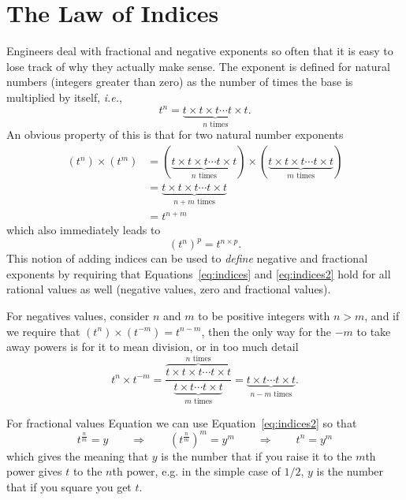 \section{The Law of Indices}

Engineers deal with fractional and negative exponents so often that it is easy to lose track of why they actually make sense. The exponent is defined for natural numbers (integers greater than zero) as the number of times the base is multiplied by itself, \textit{i.e.},
\begin{equation}
  t^n = \underbrace{t \times t \times t \cdots t \times t}_{\mbox{$n$ times}}.
  \label{eq:power}
\end{equation}
An obvious property of this is that for two natural number exponents
\begin{align}
  \left(t^n\right) \times \left( t^m \right) &=  \left( \underbrace{t \times t \times t \cdots t \times t}_{\mbox{$n$ times}}
  \right) \times \left( \underbrace{t \times t \times t \cdots t \times t}_{\mbox{$m$ times}}
  \right) \\
  &= 
  \underbrace{t \times t \times t \cdots t \times t}_{\mbox{$n + m$ times}} \\
  &= t^{n + m}
  \label{eq:indices}
\end{align}
which also immediately leads to
\begin{equation}
  \left( t^n \right)^p = t^{n \times p}.
  \label{eq:indices2}
\end{equation}
This notion of adding indices can be used to \emph{define} negative and fractional exponents by requiring that Equations~\ref{eq:indices} and \ref{eq:indices2} hold for all rational values as well (negative values, zero and fractional values). 

For negatives values, consider $n$ and $m$ to be positive integers with $n > m$, and if we require that $\left( t^n \right) \times \left( t^{-m} \right) = t^{n-m}$, then the only way for the $-m$ to take away powers is for it to mean division, or in too much detail
\begin{equation}
  t^n \times t^{-m} = \frac{\overbrace{t \times t \times t \cdots t \times t}^{\mbox{$n$ times}}}{\underbrace{t \times t \cdots t \times t}_{\mbox{$m$ times}}} = \underbrace{t \times t  \cdots t \times t}_{\mbox{$n-m$ times}}.
  \label{eq:indices3}
\end{equation}

For fractional values Equation we can use Equation~\ref{eq:indices2} so that
\begin{equation}
  t^\frac{n}{m} = y \qquad \Longrightarrow \qquad \left( t^\frac{n}{m} \right)^m = y^m \qquad \Longrightarrow \qquad t^n = y^m
\end{equation}
which gives the meaning that $y$ is the number that if you raise it to the $m$th power gives $t$ to the $n$th power, e.g. in the simple case of $1/2$, $y$ is the number that if you square you get $t$.


